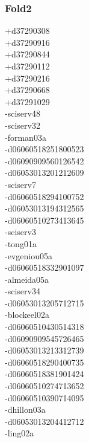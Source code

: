 \begin{multicols}{4}
\subsubsection*{Fold2}
+d37290308\\
+d37290916\\
+d37290844\\
+d37290112\\
+d37290216\\
+d37290668\\
+d37291029\\
-sciserv48\\
-sciserv32\\
-forman03a\\
-d06060518251800523\\
-d06090909560126542\\
-d06053013201212609\\
-sciserv7\\
-d06060518294100752\\
-d06053013194312565\\
-d06060510273413645\\
-sciserv3\\
-tong01a\\
-evgeniou05a\\
-d06060518332901097\\
-almeida05a\\
-sciserv34\\
-d06053013205712715\\
-blockeel02a\\
-d06060510430514318\\
-d06090909545726465\\
-d06053013213312739\\
-d06060518290400735\\
-d06060518381901424\\
-d06060510274713652\\
-d06060510390714095\\
-dhillon03a\\
-d06053013204412712\\
-ling02a\\

\end{multicols}
